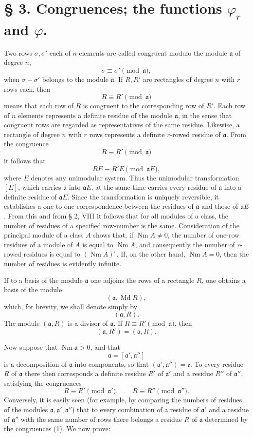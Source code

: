 \documentclass[11pt,a4paper]{article}
\newcommand{\Md}{\operatorname{Md}}
\newcommand{\Nm}{\operatorname{Nm}}
\begin{document}
\section*{§ 3. Congruences; the functions $\varphi_r$ and $\varphi$.}

Two rows $\sigma,\sigma'$ each of $n$ elements are called congruent modulo the module $\mathfrak a$ of degree $n$,
\[
 \sigma\equiv\sigma'\pmod{\mathfrak a},
\]
when $\sigma-\sigma'$ belongs to the module $\mathfrak a$. If $R,R'$ are rectangles of degree $n$ with $r$ rows each, then
\[
 R\equiv R'\pmod{\mathfrak a}
\]
means that each row of $R$ is congruent to the corresponding row of $R'$. Each row of $n$ elements represents a definite residue of the module $\mathfrak a$, in the sense that congruent rows are regarded as representatives of the same residue. Likewise, a rectangle of degree $n$ with $r$ rows represents a definite $r$-rowed residue of $\mathfrak a$. From the congruence
\[
 R\equiv R'\pmod{\mathfrak a}
\]
it follows that
\[
 RE\equiv R'E\pmod{\mathfrak aE},
\]
where $E$ denotes any unimodular system. Thus the unimodular transformation $[E]$, which carries $\mathfrak a$ into $\mathfrak aE$, at the same time carries every residue of $\mathfrak a$ into a definite residue of $\mathfrak aE$. Since the transformation is uniquely reversible, it establishes a one-to-one correspondence between the residues of $\mathfrak a$ and those of $\mathfrak aE$. From this and from § 2, VIII it follows that for all modules of a class, the number of residues of a specified row-number is the same. Consideration of the principal module of a class $A$ shows that, if $\Nm A\ne0$, the number of one-row residues of a module of $A$ is equal to $\Nm A$, and consequently the number of $r$-rowed residues is equal to $(\Nm A)^r$. If, on the other hand, $\Nm A=0$, then the number of residues is evidently infinite.

If to a basis of the module $\mathfrak a$ one adjoins the rows of a rectangle $R$, one obtains a basis of the module
\[
 (\mathfrak a,\Md R),
\]
which, for brevity, we shall denote simply by
\[
 (\mathfrak a,R).
\]
The module $(\mathfrak a,R)$ is a divisor of $\mathfrak a$. If $R\equiv R'\pmod{\mathfrak a}$, then
\[
 (\mathfrak a,R')=(\mathfrak a,R).
\]

Now suppose that $\Nm\mathfrak a>0$, and that
\[
 \mathfrak a=[\mathfrak a',\mathfrak a'']
\]
is a decomposition of $\mathfrak a$ into components, so that $(\mathfrak a',\mathfrak a'')=\mathfrak e$. To every residue $R$ of $\mathfrak a$ there then corresponds a definite residue $R'$ of $\mathfrak a'$ and a residue $R''$ of $\mathfrak a''$, satisfying the congruences
\begin{equation}
 R\equiv R'\pmod{\mathfrak a'},
 \qquad
 R\equiv R''\pmod{\mathfrak a''}.
\tag{1}
\end{equation}
Conversely, it is easily seen (for example, by comparing the numbers of residues of the modules $\mathfrak a,\mathfrak a',\mathfrak a''$) that to every combination of a residue of $\mathfrak a'$ and a residue of $\mathfrak a''$ with the same number of rows there belongs a residue $R$ of $\mathfrak a$ determined by the congruences (1). We now prove:
\end{document}

